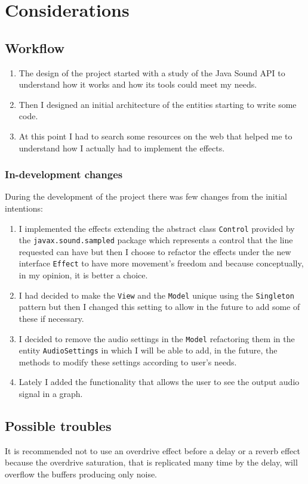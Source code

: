 \chapter{Considerations}

\section{Workflow}
\begin{enumerate}
  \item The design of the project started with a study of the Java
  Sound API to understand how it works and how its tools could meet my
  needs.
  \item Then I designed an initial architecture of the entities starting
  to write some code.
  \item At this point I had to search some resources on the web that
  helped me to understand how I actually had to implement the effects.
\end{enumerate}

\subsection{In-development changes}
During the development of the project there was few changes from the
initial intentions:
\begin{enumerate}
  \item I implemented the effects extending the abstract class
    \texttt{Control} provided by the \texttt{javax.sound.sampled}
    package which represents a control that the line requested can have but
    then I choose to refactor the effects under the new interface
    \texttt{Effect} to have more movement's freedom and
    because conceptually, in my opinion, it is better a choice.
  \item I had decided to make the \texttt{View} and the
    \texttt{Model} unique using the \texttt{Singleton} pattern
    but then I changed this setting to allow in the future to add some
    of these if necessary.
  \item I decided to remove the audio settings in the
    \texttt{Model} refactoring them in the entity
    \texttt{AudioSettings} in which I will be able to add, in the future,
    the methods to modify these settings according to user's needs.
  \item Lately I added the functionality that allows the user to see the
    output audio signal in a graph.
\end{enumerate}

\section{Possible troubles}

It is recommended not to use an overdrive effect before a delay
or a reverb effect because the overdrive saturation, that is replicated
many time by the delay, will overflow the buffers producing only noise.
